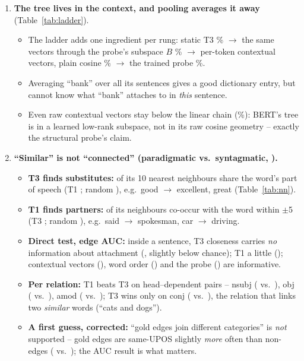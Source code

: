 \documentclass[11pt,a4paper]{article}
\begin{document}
\begin{enumerate}
\item \textbf{The tree lives in the context, and pooling averages it away} (Table~\ref{tab:ladder}).
\begin{itemize}
\item The ladder adds one ingredient per rung: static T3 \TThreePool\% $\to$ the same vectors through the probe's subspace $B$
\LadProjPool\% $\to$ per-token contextual vectors, plain cosine \LadCtxPool\% $\to$ the trained probe \TTwoRefPool\%.
\item Averaging ``bank'' over all its sentences gives a good dictionary entry, but cannot know what ``bank'' attaches to in
\emph{this} sentence.
\item Even raw contextual vectors stay below the linear chain (\ChainPool\%): BERT's tree is in a learned low-rank subspace, not in its raw
cosine geometry -- exactly the structural probe's claim.
\end{itemize}
\item \textbf{``Similar'' is not ``connected'' (paradigmatic vs.\ syntagmatic, \citealt{sahlgren}).}
\begin{itemize}
\item \textbf{T3 finds substitutes:} \NNSameTThree{} of its 10 nearest neighbours share the word's part of speech (T1 \NNSameTOne; random
\NNSameRandom), e.g.\ good $\to$ excellent, great (Table~\ref{tab:nn}).
\item \textbf{T1 finds partners:} \NNCoocTOne{} of its neighbours co-occur with the word within $\pm$5 (T3 \NNCoocTThree; random
\NNCoocRandom), e.g.\ said $\to$ spokesman, car $\to$ driving.
\item \textbf{Direct test, edge AUC:} inside a sentence, T3 closeness carries \emph{no} information about attachment (\AucTThree, slightly
below chance); T1 a little (\AucTOne); contextual vectors (\AucCtx), word order (\AucChain) and the probe (\AucProbe) are informative.
\item \textbf{Per relation:} T1 beats T3 on head--dependent pairs -- nsubj (\TOneRelNsubj{} vs.\ \TThreeRelNsubj), obj (\TOneRelObj{} vs.\
\TThreeRelObj), amod (\TOneRelAmod{} vs.\ \TThreeRelAmod); T3 wins only on conj (\TThreeRelConj{} vs.\ \TOneRelConj), the relation that
links two \emph{similar} words (``cats and dogs'').
\item \textbf{A first guess, corrected:} ``gold edges join different categories'' is \emph{not} supported -- gold edges are same-UPOS
slightly \emph{more} often than non-edges (\GoldSameUpos{} vs.\ \GoldSameUposNon); the AUC result is what matters.

\end{itemize}
\end{enumerate}
\end{document}

